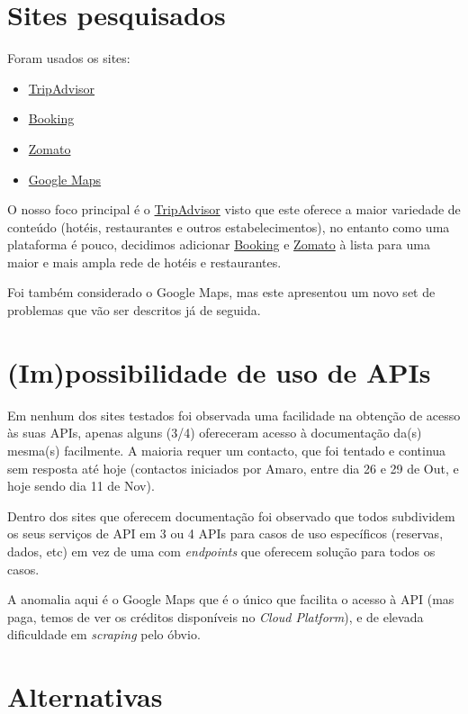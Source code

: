 \documentclass[a4paper,10pt]{article}
\begin{document}
\section{Sites pesquisados}

Foram usados os sites:
\begin{itemize}
    \item \href{https://www.tripadvisor.com/}{TripAdvisor}
    \item \href{https://www.booking.com/}{Booking}
    \item \href{https://www.zomato.com/}{Zomato}
    \item \href{https://developers.google.com/maps}{Google Maps}
\end{itemize}

O nosso foco principal é o \href{https://www.tripadvisor.com/}{TripAdvisor} visto que este oferece a maior variedade de conteúdo (hotéis, restaurantes e outros estabelecimentos), no entanto como uma plataforma é pouco, decidimos adicionar \href{https://www.booking.com/}{Booking} e \href{https://www.zomato.com/}{Zomato} à lista para uma maior e mais ampla rede de hotéis e restaurantes.

Foi também considerado o Google Maps, mas este apresentou um novo set de problemas que vão ser descritos já de seguida.

\section{(Im)possibilidade de uso de APIs}

Em nenhum dos sites testados foi observada uma facilidade na obtenção de acesso às suas APIs, apenas alguns (3/4) ofereceram acesso à documentação da(s) mesma(s) facilmente. A maioria requer um contacto, que foi tentado e continua sem resposta até hoje (contactos iniciados por Amaro, entre dia 26 e 29 de Out, e hoje sendo dia 11 de Nov).

Dentro dos sites que oferecem documentação foi observado que todos subdividem os seus serviços de API em 3 ou 4 APIs para casos de uso específicos (reservas, dados, etc) em vez de uma com \textit{endpoints} que oferecem solução para todos os casos.

A anomalia aqui é o Google Maps que é o único que facilita o acesso à API (mas paga, temos de ver os créditos disponíveis no \textit{Cloud Platform}), e de elevada dificuldade em \textit{scraping} pelo óbvio.

\section{Alternativas}
\end{document}
